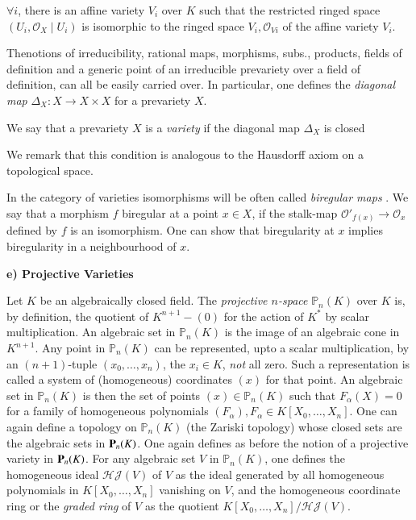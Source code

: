 $\forall i$, there is an affine variety $V_i$ over $K$ such that the
restricted ringed space $(U_i ,\mathscr{O}_X \mid U_i)$ is isomorphic
to the ringed space $V_i,\mathscr{O}_{Vi}$ of the affine variety $V_i$. 

The\pageoriginale notions of irreducibility, rational maps, morphisms, subs.,
products, fields of definition and a generic point of an irreducible
prevariety over a field of 
definition, can all be easily carried over. In particular, one
defines the \textit{diagonal map} $\Delta_X : X
\rightarrow X\times X$ for a prevariety $X$. 

\begin{defi*}%
  We say that a prevariety $X$ is a \textit{ variety } if the
  diagonal map $\Delta_X$ is closed  
\end{defi*}

We remark that this condition is analogous to the Hausdorff axiom on a
topological space. 

In the category of varieties isomorphisms will be often called
\textit{ biregular maps }. We say that a morphism $f$ biregular at a
point $x \in X$, if the stalk-map $\mathscr{O}'_{f(x)} \rightarrow
\mathscr{O}_{x}$ defined by $f$ is an isomorphism. One can show that
biregularity at $x$ implies biregularity in a neighbourhood of $x$. 
 
\medskip
\noindent \textbf{e) Projective Varieties}

Let $K$ be an algebraically closed field. The \textit{ projective
  $n$-space} $\mathbb{P}_n (K)$ over $K$  is, by definition, the
quotient of $K^{n+1} -(0)$ for the action of $K^*$ by scalar
multiplication. An algebraic set in $\mathbb{P}_n (K)$ is the image of
an algebraic cone in $K^{n+1}$. Any point in
$\mathbb{P}_n(K)$ can be represented, upto a scalar multiplication, by
an $(n+1)$-tuple $(x_0,\ldots, x_n)$, the $x_i \in K$, \textit{ not }
all zero. Such a representation is called a system of (homogeneous)
coordinates $(x)$ for that point. An algebraic set in $\mathbb{P}_n
(K)$ is then the set of points $(x)\in \mathbb{P}_n (K)$ such that
$F_{\alpha} (X) = 0 $ for a family of homogeneous polynomials
$(F_{\alpha}),F_{\alpha} \in K [X_0 ,\ldots , X_n]$.\pageoriginale
One can again define a topology on $\mathbb{P}_n (K)$ (the
Zariski topology) whose closed sets are the algebraic sets in
$\mathbf{P}_n(K)$. One again defines as before the notion of a projective
variety in $\mathbf{P}_n 
(K)$. For  any algebraic set $V$ in $\mathbb{P}_n (K)$, one defines
the homogeneous ideal $\mathscr{H} \mathcal{J}(V)$ of $V$ as the ideal
generated by all homogeneous polynomials in $K[X_0,\ldots, X_n]$
vanishing on $V$, and the homogeneous coordinate ring or the
\textit{graded ring} of $V$ as the quotient $K[X_0,\ldots,X_n] /
\mathscr{H} \mathcal{J} (V)$. 

